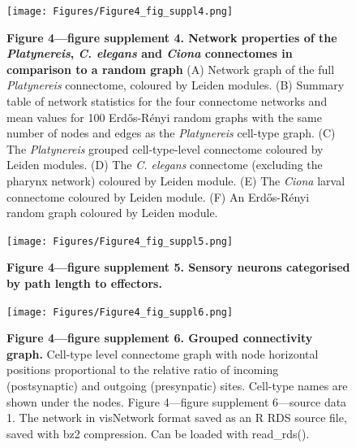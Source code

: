 \documentclass[
  11pt,
]{article}
\begin{document}
\begin{figure}[H]

{\centering \texttt{[image: Figures/Figure4\_fig\_suppl4.png]}

}

\caption{\textbf{Figure 4---figure supplement 4. Network properties of
the \emph{Platynereis}, \emph{C. elegans} and \emph{Ciona} connectomes
in comparison to a random graph } (A) Network graph of the full
\emph{Platynereis} connectome, coloured by Leiden modules. (B) Summary
table of network statistics for the four connectome networks and mean
values for 100 Erdős-Rényi random graphs with the same number of nodes
and edges as the \emph{Platynereis} cell-type graph. (C) The
\emph{Platynereis} grouped cell-type-level connectome coloured by Leiden
modules. (D) The \emph{C. elegans} connectome (excluding the pharynx
network) coloured by Leiden module. (E) The \emph{Ciona} larval
connectome coloured by Leiden module. (F) An Erdős-Rényi random graph
coloured by Leiden module.}

\end{figure}%

\begin{figure}[H]

{\centering \texttt{[image: Figures/Figure4\_fig\_suppl5.png]}

}

\caption{\textbf{Figure 4---figure supplement 5. Sensory neurons
categorised by path length to effectors.}}

\end{figure}%

\begin{figure}[H]

{\centering \texttt{[image: Figures/Figure4\_fig\_suppl6.png]}

}

\caption{\textbf{Figure 4---figure supplement 6. Grouped connectivity
graph. } Cell-type level connectome graph with node horizontal positions
proportional to the relative ratio of incoming (postsynaptic) and
outgoing (presynpatic) sites. Cell-type names are shown under the nodes.
Figure 4---figure supplement 6---source data 1. The network in
visNetwork format saved as an R RDS source file, saved with bz2
compression. Can be loaded with read\_rds().}

\end{figure}%
\end{document}

